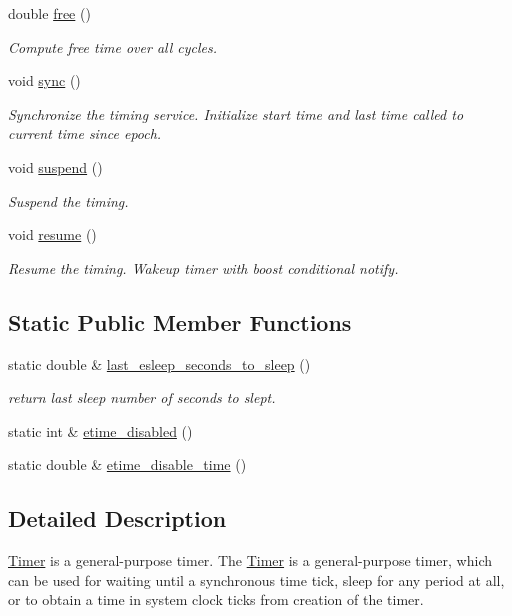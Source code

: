 \begin{DoxyCompactItemize}
double \hyperlink{classRCS_1_1Timer_af7ed219a6157e28f7555a2c52d3c10f0}{free} ()
\begin{DoxyCompactList}\small\item\em Compute free time over all cycles. \end{DoxyCompactList}\item 
void \hyperlink{classRCS_1_1Timer_a6e97c4f4d236d76f9e21f07b2a4ee542}{sync} ()
\begin{DoxyCompactList}\small\item\em Synchronize the timing service. Initialize start time and last time called to current time since epoch. \end{DoxyCompactList}\item 
void \hyperlink{classRCS_1_1Timer_ae83a5a6260dd5d79ab884ef593df2db3}{suspend} ()
\begin{DoxyCompactList}\small\item\em Suspend the timing. \end{DoxyCompactList}\item 
void \hyperlink{classRCS_1_1Timer_a4ff4189ac7fe91e9eb647b5e1d5e55b7}{resume} ()
\begin{DoxyCompactList}\small\item\em Resume the timing. Wakeup timer with boost conditional notify. \end{DoxyCompactList}\end{DoxyCompactItemize}
\subsection*{Static Public Member Functions}
\begin{DoxyCompactItemize}
\item 
static double \& \hyperlink{classRCS_1_1Timer_a9f48b5e2bd0504c75fee1b47c6ea8047}{last\-\_\-esleep\-\_\-seconds\-\_\-to\-\_\-sleep} ()
\begin{DoxyCompactList}\small\item\em return last sleep number of seconds to slept. \end{DoxyCompactList}\item 
static int \& \hyperlink{classRCS_1_1Timer_a98f34c3fdfda98529ebdffdf1019ac5e}{etime\-\_\-disabled} ()
\item 
static double \& \hyperlink{classRCS_1_1Timer_ace5214da460a817d1a90d87636efe11e}{etime\-\_\-disable\-\_\-time} ()
\end{DoxyCompactItemize}


\subsection{Detailed Description}
\hyperlink{classRCS_1_1Timer}{Timer} is a general-\/purpose timer. The \hyperlink{classRCS_1_1Timer}{Timer} is a general-\/purpose timer, which can be used for waiting until a synchronous time tick, sleep for any period at all, or to obtain a time in system clock ticks from creation of the timer. 

